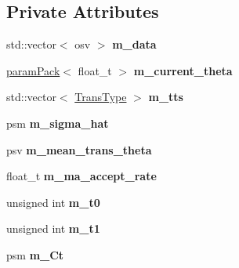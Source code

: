 \subsection*{Private Attributes}
\begin{DoxyCompactItemize}
\item 
\mbox{\label{classada__pmmh__mvn_a5088adab431640298be526751ca2fa94}} 
std\+::vector$<$ osv $>$ {\bfseries m\+\_\+data}
\item 
\mbox{\label{classada__pmmh__mvn_a2d33f16a15e709862cbe4ca13249c7a1}} 
\hyperlink{classparamPack}{param\+Pack}$<$ float\+\_\+t $>$ {\bfseries m\+\_\+current\+\_\+theta}
\item 
\mbox{\label{classada__pmmh__mvn_ab003f4ee2c98ac1a22cd0a504830aef5}} 
std\+::vector$<$ \hyperlink{param__transforms_8h_acee593b112f4fc85f850631b9c6aaae9}{Trans\+Type} $>$ {\bfseries m\+\_\+tts}
\item 
\mbox{\label{classada__pmmh__mvn_afff9cd2d50bb0577aa861f30df27d4eb}} 
psm {\bfseries m\+\_\+sigma\+\_\+hat}
\item 
\mbox{\label{classada__pmmh__mvn_ab95fb64336166bbad83562a75f80a1f7}} 
psv {\bfseries m\+\_\+mean\+\_\+trans\+\_\+theta}
\item 
\mbox{\label{classada__pmmh__mvn_a668c49d3ef53a5c69dcc96b4784a34f0}} 
float\+\_\+t {\bfseries m\+\_\+ma\+\_\+accept\+\_\+rate}
\item 
\mbox{\label{classada__pmmh__mvn_aa8208a1108ef730a8f67efce9c804753}} 
unsigned int {\bfseries m\+\_\+t0}
\item 
\mbox{\label{classada__pmmh__mvn_ab3cf6f22e3efd4869eca06c78325b20f}} 
unsigned int {\bfseries m\+\_\+t1}
\item 
\mbox{\label{classada__pmmh__mvn_a8b2d63854397e746b7118c75e310686b}} 
psm {\bfseries m\+\_\+\+Ct}
\item 
\mbox{\label{classada__pmmh__mvn_a0d49f77bf7ea14f780f6192ad520410f}} 

\end{DoxyCompactItemize}
